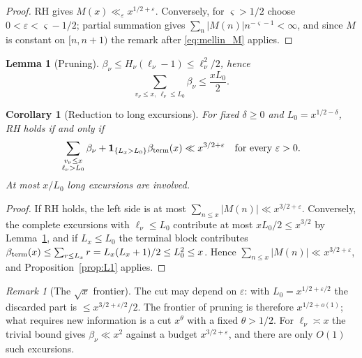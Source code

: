 \documentclass[11pt]{amsart}
\numberwithin{equation}{section}
\theoremstyle{plain}
\newtheorem{lemma}[theorem]{Lemma}
\newtheorem{corollary}[theorem]{Corollary}
\theoremstyle{definition}
\theoremstyle{remark}
\newtheorem{remark}[theorem]{Remark}
\newcommand{\eps}{\varepsilon}
\begin{document}
\begin{proof}
RH gives $M(x)\ll_\eps x^{1/2+\eps}$. Conversely, for $\varsigma>1/2$ choose
$0<\eps<\varsigma-1/2$; partial summation gives
$\sum_n|M(n)|n^{-\varsigma-1}<\infty$, and since $M$ is constant on $[n,n+1)$
the remark after \eqref{eq:mellin_M} applies.
\end{proof}

\begin{lemma}[Pruning]
\label{lem:pruning}
$\beta_\nu\le H_\nu(\ell_\nu-1)\le\ell_\nu^2/2$, hence
\begin{equation}
\label{eq:pruning}
  \sum_{v_\nu\le x,\ \ell_\nu\le L_0}\beta_\nu\le\frac{xL_0}{2}.
\end{equation}
\end{lemma}

\begin{corollary}[Reduction to long excursions]
\label{cor:long}
For fixed $\delta\ge0$ and $L_0=x^{1/2-\delta}$, RH holds if and only if
\begin{equation}
\label{eq:long_reduction}
  \sum_{\substack{v_\nu\le x\\ \ell_\nu>L_0}}\beta_\nu
  +\mathbf 1_{\{L_x>L_0\}}\beta_{\rm term}(x)\ll x^{3/2+\eps}
  \quad\text{for every }\eps>0.
\end{equation}
At most $x/L_0$ long excursions are involved.
\end{corollary}

\begin{proof}
If RH holds, the left side is at most $\sum_{n\le x}|M(n)|\ll x^{3/2+\eps}$.
Conversely, the complete excursions with $\ell_\nu\le L_0$ contribute at
most $xL_0/2\le x^{3/2}$ by Lemma~\ref{lem:pruning}, and if $L_x\le L_0$
the terminal block contributes
$\beta_{\rm term}(x)\le\sum_{r\le L_x}r=L_x(L_x+1)/2\le L_0^2\le x$.
Hence $\sum_{n\le x}|M(n)|\ll x^{3/2+\eps}$, and
Proposition~\ref{prop:L1} applies.
\end{proof}

\begin{remark}[The $\sqrt{x}$ frontier]
\label{rem:sqrt_frontier}
The cut may depend on $\eps$: with $L_0=x^{1/2+\eps/2}$ the discarded part is
$\le x^{3/2+\eps/2}/2$. The frontier of pruning is therefore $x^{1/2+o(1)}$;
what requires new information is a cut $x^{\theta}$ with a fixed
$\theta>1/2$. For $\ell_\nu\asymp x$ the trivial bound gives
$\beta_\nu\ll x^2$ against a budget $x^{3/2+\eps}$, and there are only
$O(1)$ such excursions.
\end{remark}
\end{document}
